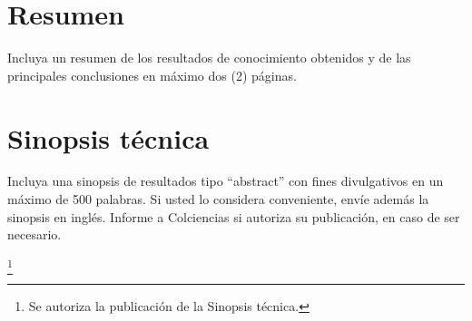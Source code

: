 

\newpage
\section{Resumen }
\begin{instrucciones}
Incluya un resumen de los resultados de conocimiento obtenidos y de las principales conclusiones en máximo dos (2) páginas.
\end{instrucciones}




\section{Sinopsis técnica}
\begin{instrucciones}
Incluya una sinopsis de resultados tipo “abstract” con fines divulgativos en un máximo de 500 palabras. Si usted lo considera conveniente, envíe además la
sinopsis en inglés. Informe a Colciencias si autoriza su publicación, en caso de ser necesario. 
\end{instrucciones}

{}\footnote{Se autoriza la publicación de la Sinopsis técnica.}

